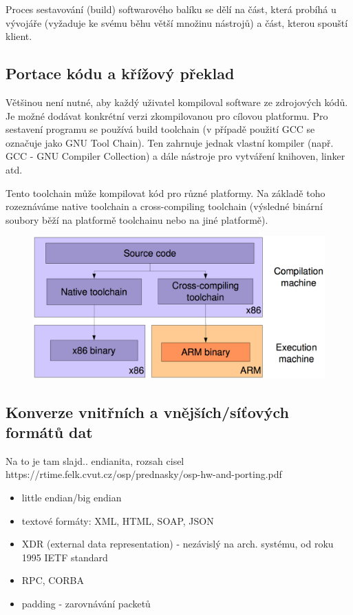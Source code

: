 Proces sestavování (build) softwarového balíku se dělí na část, která probíhá u vývojáře (vyžaduje ke svému běhu větší množinu nástrojů) a část, kterou spouští klient.

\subsection{Portace kódu a křížový překlad}
Většinou není nutné, aby každý uživatel kompiloval software ze zdrojových kódů. Je možné dodávat konkrétní verzi zkompilovanou pro cílovou platformu. Pro sestavení programu se používá build toolchain (v případě použití GCC se označuje jako GNU Tool Chain). Ten zahrnuje jednak vlastní kompiler (např. GCC - GNU Compiler Collection) a dále nástroje pro vytváření knihoven, linker atd.

Tento toolchain může kompilovat kód pro různé platformy. Na základě toho rozeznáváme native toolchain a cross-compiling toolchain (výsledné binární soubory běží na platformě toolchainu nebo na jiné platformě).

\begin{figure}[h!]
\centering
\includegraphics[width=130mm]{08/images/portace-kodu}
\end{figure}

\subsection{Konverze vnitřních a vnějších/síťových formátů dat}

Na to je tam slajd.. endianita, rozsah cisel
https://rtime.felk.cvut.cz/osp/prednasky/osp-hw-and-porting.pdf

\begin{itemize}[itemsep=0px]
\item little endian/big endian
\item textové formáty: XML, HTML, SOAP, JSON
\item XDR (external data representation) - nezávislý na arch. systému, od roku 1995 IETF standard
\item RPC, CORBA
\item padding - zarovnávání packetů
\end{itemize}